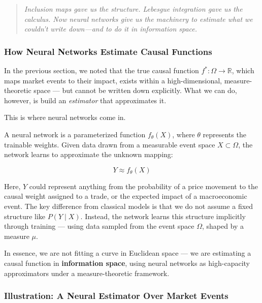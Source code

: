 \begin{quote}
\textit{Inclusion maps gave us the structure. Lebesgue integration gave us the calculus. Now neural networks give us the machinery to estimate what we couldn’t write down—and to do it in information space.}
\end{quote}



\subsubsection{How Neural Networks Estimate Causal Functions}

In the previous section, we noted that the true causal function \( f^* \colon \Omega \rightarrow \mathbb{R} \), which maps market events to their impact, exists within a high-dimensional, measure-theoretic space — but cannot be written down explicitly. What we can do, however, is build an \textit{estimator} that approximates it.

This is where neural networks come in.

A neural network is a parameterized function \( f_\theta(X) \), where \( \theta \) represents the trainable weights. Given data drawn from a measurable event space \( X \subset \Omega \), the network learns to approximate the unknown mapping:

\[
Y \approx f_\theta(X)
\]

Here, \( Y \) could represent anything from the probability of a price movement to the causal weight assigned to a trade, or the expected impact of a macroeconomic event. The key difference from classical models is that we do not assume a fixed structure like \( P(Y \mid X) \). Instead, the network learns this structure implicitly through training — using data sampled from the event space \( \Omega \), shaped by a measure \( \mu \).

In essence, we are not fitting a curve in Euclidean space — we are estimating a causal function in \textbf{information space}, using neural networks as high-capacity approximators under a measure-theoretic framework.

\subsubsection{Illustration: A Neural Estimator Over Market Events}

